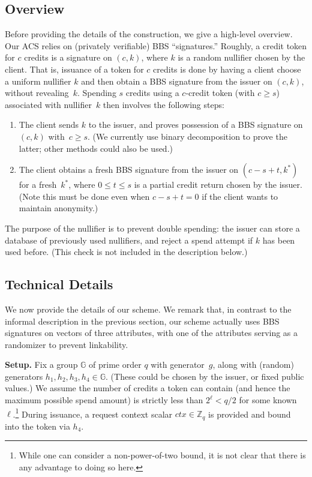 \documentclass[11pt]{article}
\def\Z{{\mathbb Z}}
\def\G{{\mathbb G}}
\def\Z{{\mathbb Z}}
\begin{document}
\subsection{Overview}
Before providing the details of the construction, we give a high-level overview.
Our ACS relies on (privately verifiable) BBS ``signatures.''  
Roughly, a credit token for $c$ credits is a signature on $(c, k)$, where $k$ is a random nullifier chosen by the client. That is, issuance of a token for $c$ credits is done by having a client choose a uniform nullifier $k$ and then obtain a BBS signature from the issuer on $(c, k)$, without revealing~$k$.
Spending $s$ credits using a $c$-credit token (with $c \geq s$) associated with nullifier~$k$ then involves the following steps:
\begin{enumerate}
    \item The client sends $k$ to the issuer, and proves possession of a BBS signature on $(c, k)$ with~$c \geq s$. (We currently use binary decomposition to prove the latter; other methods could also be used.)
    \item The client obtains a fresh BBS signature from the issuer on $(c-s+t, k^*)$ for a fresh~$k^*$, where $0 \leq t \leq s$ is a partial credit return chosen by the issuer. (Note this must be done even when $c-s+t=0$ if the client wants to maintain anonymity.)
\end{enumerate}
The purpose of the nullifier is to prevent double spending: the issuer can store a database of previously used nullifiers, and reject a spend attempt if $k$ has been used before. (This check is not included in the description below.)

\subsection{Technical Details}
We now provide the details of our scheme. We remark that, in contrast to the informal description in the previous section, our scheme actually uses BBS signatures on vectors of three attributes, with one of the attributes serving as a randomizer to prevent linkability.

\medskip\noindent
{\bf Setup.}
Fix a group $\G$ of prime order $q$ with generator~$g$, along with
(random) generators $h_1, h_2, h_3, h_4 \in \G$. (These could be chosen by the issuer, or fixed public values.)
We assume the number of credits a token can contain (and hence the maximum possible spend amount) is strictly less than $2^\ell<q/2$ for some known~$\ell$.\footnote{While one can consider a non-power-of-two bound, it is not clear that there is any advantage to doing so here.}
During issuance, a request context scalar $\mathit{ctx} \in \Z_q$ is provided and bound into the token via $h_4$.
\end{document}
